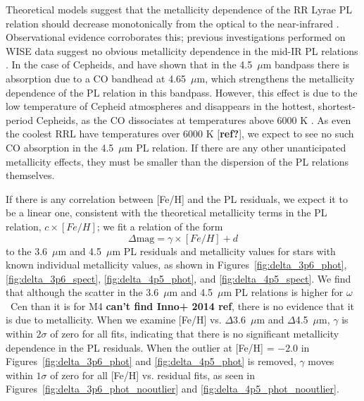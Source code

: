 \documentclass[a4paper,fleqn,usenatbib]{mnras}
\begin{document}

Theoretical models suggest that the metallicity dependence of the RR Lyrae PL relation should decrease monotonically from the optical to the near-infrared \citep{2004ApJS..154..633C, 2001MNRAS.326.1183B}. Observational evidence corroborates this; previous investigations performed on WISE data suggest no obvious metallicity dependence in the mid-IR PL relations \citep{2013ApJ...776..135M}. In the case of Cepheids, \citet{2011ApJ...743...76S} and \citet{2015arXiv150206995S} have shown that in the 4.5~$\mu$m bandpass there is absorption due to a CO bandhead at 4.65~$\mu$m, which strengthens the metallicity dependence of the PL relation in this bandpass. However, this effect is due to the low temperature of Cepheid atmospheres and disappears in the hottest, shortest-period Cepheids, as the CO dissociates at temperatures above 6000 K \citep{2012ApJ...759..146M}. As even the coolest RRL have temperatures over 6000 K [{\bf ref?}], we expect to see no such CO absorption in the 4.5~$\mu$m PL relation. If there are any other unanticipated metallicity effects, they must be smaller than the dispersion of the PL relations themselves.

If there is any correlation between [Fe/H] and the PL residuals, we expect it to be a linear one, consistent with the theoretical metallicity terms in the PL relation, $c\times[Fe/H]$; we fit a relation of the form
\begin{equation}
\Delta\text{mag} = \gamma \times[Fe/H] + d
\end{equation}
to the 3.6~$\mu$m and 4.5~$\mu$m PL residuals and metallicity values for stars with known individual metallicity values, as shown in Figures~\ref{fig:delta_3p6_phot}, \ref{fig:delta_3p6_spect}, \ref{fig:delta_4p5_phot}, and \ref{fig:delta_4p5_spect}. We find that although the scatter in the 3.6~$\mu$m and 4.5~$\mu$m PL relations is higher for $\omega$~Cen than it is for M4 \citep{2015arXiv150507858N} {\bf can't find Inno+ 2014 ref}, there is no evidence that it is due to metallicity. When we examine [Fe/H] vs. $\Delta$3.6~$\mu$m and $\Delta$4.5~$\mu$m, $\gamma$ is within $2\sigma$ of zero for all fits, indicating that there is no significant metallicity dependence in the PL residuals. When the outlier at [Fe/H] = $-2.0$ in Figures~\ref{fig:delta_3p6_phot} and \ref{fig:delta_4p5_phot} is removed, $\gamma$ moves within $1\sigma$ of zero for all [Fe/H] vs. residual fits, as seen in Figures~\ref{fig:delta_3p6_phot_nooutlier} and \ref{fig:delta_4p5_phot_nooutlier}.
\end{document}
